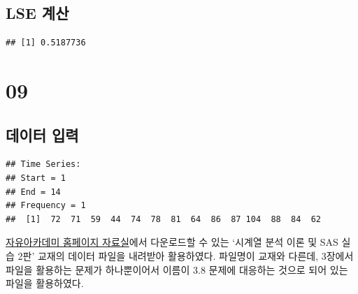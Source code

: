 \documentclass[
]{article}
\newenvironment{Shaded}{\begin{snugshade}}{\end{snugshade}}
\newcommand{\AttributeTok}[1]{\textcolor[rgb]{0.13,0.29,0.53}{#1}}
\newcommand{\DecValTok}[1]{\textcolor[rgb]{0.00,0.00,0.81}{#1}}
\newcommand{\FunctionTok}[1]{\textcolor[rgb]{0.13,0.29,0.53}{\textbf{#1}}}
\newcommand{\NormalTok}[1]{#1}
\newcommand{\OtherTok}[1]{\textcolor[rgb]{0.56,0.35,0.01}{#1}}
\newcommand{\SpecialCharTok}[1]{\textcolor[rgb]{0.81,0.36,0.00}{\textbf{#1}}}
\newcommand{\StringTok}[1]{\textcolor[rgb]{0.31,0.60,0.02}{#1}}
\begin{document}
\subsection{LSE 계산}\label{lse-uxacc4uxc0b0}

\begin{Shaded}
\end{Shaded}

\begin{verbatim}
## [1] 0.5187736
\end{verbatim}

\section{09}\label{section-2}

\subsection{데이터 입력}\label{uxb370uxc774uxd130-uxc785uxb825}

\begin{Shaded}
\end{Shaded}

\begin{verbatim}
## Time Series:
## Start = 1 
## End = 14 
## Frequency = 1 
##  [1]  72  71  59  44  74  78  81  64  86  87 104  88  84  62
\end{verbatim}

\href{http://www.freeaca.com/new/library/BoardTableList.aspx}{자유아카데미
홈페이지 자료실}에서 다운로드할 수 있는 `시계열 분석 이론 및 SAS 실습
2판' 교재의 데이터 파일을 내려받아 활용하였다. 파일명이 교재와 다른데,
3장에서 파일을 활용하는 문제가 하나뿐이어서 이름이 3.8 문제에 대응하는
것으로 되어 있는 파일을 활용하였다.
\end{document}
